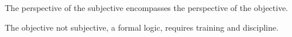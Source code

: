 

﻿The perspective of the subjective encompasses the perspective of the objective.  

The objective not subjective, a formal logic, requires training and discipline.

\bye
